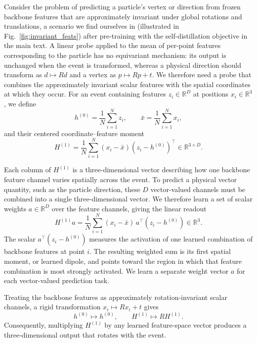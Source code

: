 Consider the problem of predicting a particle's vertex or direction from frozen backbone features that are approximately invariant under global rotations and translations, a scenario we find ourselves in (illustrated in Fig.~\ref{fig:invariant_feats}) after pre-training with the self-distillation objective in the main text. A linear probe applied to the mean of per-point features corresponding to the particle has no equivariant mechanism: its output is unchanged when the event is transformed, whereas a physical direction should transform as $d\mapsto Rd$ and a vertex as $p\mapsto Rp+t$. We therefore need a probe that combines the approximately invariant scalar features with the spatial coordinates at which they occur. For an event containing features $z_i\in\mathbb{R}^D$ at positions $x_i\in\mathbb{R}^3$, we define
\begin{equation}
    h^{(0)}=\frac{1}{N}\sum_{i=1}^N z_i,
    \qquad
    \bar{x}=\frac{1}{N}\sum_{i=1}^N x_i,
\end{equation}
and their centered coordinate--feature moment
\begin{equation}
    H^{(1)}
    =
    \frac{1}{N}\sum_{i=1}^N
    (x_i-\bar{x})(z_i-h^{(0)})^\top
    \in\mathbb{R}^{3\times D}.
\end{equation}

Each column of $H^{(1)}$ is a three-dimensional vector describing how one backbone feature channel varies spatially across the event. To predict a physical vector quantity, such as the particle direction, these $D$ vector-valued channels must be combined into a single three-dimensional vector. We therefore learn a set of scalar weights $a\in\mathbb{R}^D$ over the feature channels, giving the linear readout
\begin{equation}
    H^{(1)}a
    =
    \frac{1}{N}\sum_{i=1}^N
    (x_i-\bar{x})\,a^\top(z_i-h^{(0)})
    \in\mathbb{R}^3.
\end{equation}
The scalar $a^\top(z_i-h^{(0)})$ measures the activation of one learned combination of backbone features at point $i$. The resulting weighted sum is its first spatial moment, or learned dipole, and points toward the region in which that feature combination is most strongly activated. We learn a separate weight vector $a$ for each vector-valued prediction task.

Treating the backbone features as approximately rotation-invariant scalar channels, a rigid transformation $x_i\mapsto Rx_i+t$ gives
\begin{equation}
    h^{(0)}\mapsto h^{(0)},
    \qquad
    H^{(1)}\mapsto RH^{(1)}.
\end{equation}
Consequently, multiplying $H^{(1)}$ by any learned feature-space vector produces a three-dimensional output that rotates with the event.

